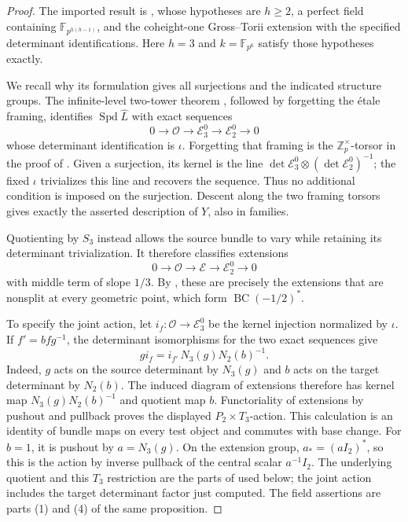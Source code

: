 \documentclass[11pt]{article}
\numberwithin{equation}{section}
\theoremstyle{definition}
\theoremstyle{remark}
\newcommand{\Z}{\mathbb Z}
\newcommand{\F}{\mathbb F}
\newcommand{\cO}{\mathcal O}
\DeclareMathOperator{\Spd}{Spd}
\begin{document}
\begin{proof}
The imported result is \cite[Proposition 2.7.1(1)--(5)]{BMR2026}, whose
hypotheses are $h\ge2$, a perfect field containing
$\F_{p^{h(h-1)}}$, and the coheight-one Gross--Torii extension with the
specified determinant identifications.  Here $h=3$ and
$k=\F_{p^6}$ satisfy those hypotheses exactly.

We recall why its formulation gives all surjections and the indicated
structure groups.  The infinite-level two-tower theorem
\cite[Theorem 2.6.3]{BMR2026}, followed by forgetting the étale framing,
identifies $\Spd\widehat L$ with exact sequences
\[
 0\longrightarrow\cO\longrightarrow\mathcal E_3^0
   \longrightarrow\mathcal E_2^0\longrightarrow0
\]
whose determinant identification is $\iota$.  Forgetting that framing is
the $\Z_p^{\times}$-torsor in the proof of
\cite[Proposition 2.7.1(2)]{BMR2026}.  Given a surjection, its kernel is
the line
$\det\mathcal E_3^0\otimes(\det\mathcal E_2^0)^{-1}$; the fixed
$\iota$ trivializes this line and recovers the sequence.  Thus no
additional condition is imposed on the surjection.  Descent along the
two framing torsors gives exactly the asserted description of $Y$, also
in families.

Quotienting by $S_3$ instead allows the source bundle to vary while
retaining its determinant trivialization.  It therefore classifies
extensions
\[
 0\longrightarrow\cO\longrightarrow\mathcal E
   \longrightarrow\mathcal E_2^0\longrightarrow0
\]
with middle term of slope $1/3$.  By
\cite[Proposition 2.7.1(5)]{BMR2026}, these are precisely the extensions
that are nonsplit at every geometric point, which form
$\operatorname{BC}(-1/2)^*$.

To specify the joint action, let $i_f:\cO\to\mathcal E_3^0$ be the
kernel injection normalized by $\iota$.  If $f'=bfg^{-1}$, the
determinant isomorphisms for the two exact sequences give
\[
 g i_f=i_{f'}\,N_3(g)N_2(b)^{-1}.
\]
Indeed, $g$ acts on the source determinant by $N_3(g)$ and $b$ acts on
the target determinant by $N_2(b)$.  The induced diagram of extensions
therefore has kernel map $N_3(g)N_2(b)^{-1}$ and quotient map $b$.
Functoriality of extensions by pushout and pullback proves the displayed
$P_2\times T_3$-action.  This calculation is an identity of bundle maps
on every test object and commutes with base change.  For $b=1$, it is
pushout by $a=N_3(g)$.  On the extension group, $a_*=(aI_2)^*$,
so this is the action by inverse pullback of the central scalar $a^{-1}I_2$.
The underlying quotient and this $T_3$ restriction
are the parts of \cite[Proposition 2.7.1(5)]{BMR2026} used below; the
joint action includes the target determinant factor just computed.
The field assertions are parts (1) and (4) of the same proposition.
\end{proof}
\end{document}
